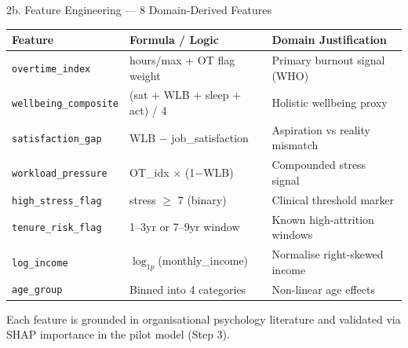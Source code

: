 \documentclass[aspectratio=169, 10pt]{beamer}
\begin{document}
\begin{frame}{2b. Feature Engineering --- 8 Domain-Derived Features}
\footnotesize
\begin{center}
\begin{tabular}{@{}l l l@{}}
  \toprule
  \textbf{Feature} & \textbf{Formula / Logic} & \textbf{Domain Justification} \\
  \midrule
  \texttt{overtime\_index}      & hours/max + OT flag weight       & Primary burnout signal (WHO) \\
  \texttt{wellbeing\_composite} & (sat + WLB + sleep + act) / 4    & Holistic wellbeing proxy \\
  \texttt{satisfaction\_gap}    & WLB $-$ job\_satisfaction         & Aspiration vs reality mismatch \\
  \texttt{workload\_pressure}   & OT\_idx $\times$ (1$-$WLB)       & Compounded stress signal \\
  \texttt{high\_stress\_flag}   & stress $\geq$ 7 (binary)         & Clinical threshold marker \\
  \texttt{tenure\_risk\_flag}   & 1--3yr or 7--9yr window          & Known high-attrition windows \\
  \texttt{log\_income}          & $\log_{1p}$(monthly\_income)     & Normalise right-skewed income \\
  \texttt{age\_group}           & Binned into 4 categories         & Non-linear age effects \\
  \bottomrule
\end{tabular}
\end{center}

\vspace{8pt}
\small
Each feature is grounded in organisational psychology literature and validated via SHAP importance in the pilot model (Step 3).
\end{frame}
\end{document}
